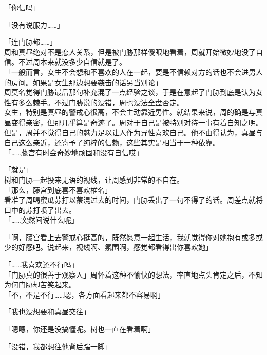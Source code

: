 「你信吗」

「没有说服力……」

「连门胁都……」\\

周和真昼绝对不是恋人关系，但是被门胁那样傻眼地看着，周就开始微妙地没了自信。不过周本来就没多少自信就是了。\\

「一般而言，女生不会想和不喜欢的人在一起，要是不信赖对方的话也不会进男人的房间。如果是女生那边想要袭击的话另当别论」\\

周莫名觉得门胁最后那句补充混了一点经验之谈，于是在意起了门胁到底是认为女性有多么棘手。不过门胁说的没错，周也没法全盘否定。\\

女生，特别是真昼的警戒心很高，不会主动靠近男性。就结果来说，周的确是与真昼变得亲密，但那几乎算是奇迹了。周对于自己是被特别对待一事有着自知之明。\\

但是，周并不觉得自己的魅力足以让人作为异性喜欢自己。他不由得认为，真昼与自己这么亲近，还寄予了纯粹的信赖，这些其实是相当于一种依靠。\\

「……藤宫有时会奇妙地顽固和没有自信哎」

「就是」\\

树和门胁一起投来无语的视线，让周感到非常的不自在。\\

「那么，藤宫到底喜不喜欢椎名」\\

看准了周喝蜜瓜苏打以蒙混过去的时间，门胁丢出了一句不得了的话。周差点就将口中的苏打喷了出去。\\

「……突然间说什么呢」

「啊，藤宫看上去警戒心挺高的，既然愿意一起生活，我就觉得你对她抱有或多或少的好感吧。说起来，视线啊、氛围啊，感觉都看得出你喜欢她」

「……我喜欢还不行吗」\\

「门胁真的很善于观察人」周怀着这种不愉快的想法，率直地点头肯定之后，不知为何门胁却苦笑起来。\\

「不，不是不行……嗯，各方面看起来都不容易啊」

「我也没想要和真昼交往」

「嗯嗯，你还是没搞懂呢。树也一直在看着啊」

「没错，我都想往他背后踹一脚」

